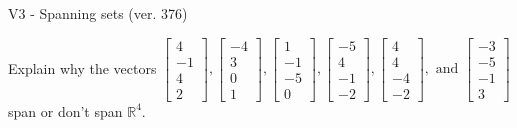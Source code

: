 \begin{exercise}
  \begin{exerciseTitle}V3 - Spanning sets (ver. 376)\end{exerciseTitle}
  \begin{exerciseStatement}
    Explain why the vectors \(\left[\begin{array}{r}
4 \\
-1 \\
4 \\
2
\end{array}\right] , \left[\begin{array}{r}
-4 \\
3 \\
0 \\
1
\end{array}\right] , \left[\begin{array}{r}
1 \\
-1 \\
-5 \\
0
\end{array}\right] , \left[\begin{array}{r}
-5 \\
4 \\
-1 \\
-2
\end{array}\right] , \left[\begin{array}{r}
4 \\
4 \\
-4 \\
-2
\end{array}\right] , \text{ and } \left[\begin{array}{r}
-3 \\
-5 \\
-1 \\
3
\end{array}\right]\) span or don't span \(\mathbb{R}^4\). 
	



\end{exerciseStatement}
\end{exercise}
